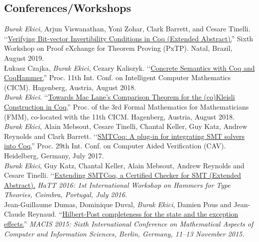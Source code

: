 \documentclass[12pt, a4paper]{article}
\newcommand{\years}[1]{\marginnote{\scriptsize #1}}
\begin{document}
\subsection*{Conferences/Workshops}
\years{\normalsize2019}
\emph{Burak Ekici}, Arjun Viswanathan, Yoni Zohar, Clark Barrett, and Cesare
Tinelli.
\lq\lq{\href{https://www.mimuw.edu.pl/~lukaszcz/cicm2018.pdf}{Verifying Bit-vector Invertibility Conditions in Coq (Extended Abstract).}}''
Sixth Workshop on Proof eXchange for Theorem Proving (PxTP). Natal, Brazil, August 2019.
\\[0.25cm]
\years{\normalsize2018}
\L ukasz Czajka, \emph{Burak Ekici}, Cezary Kaliszyk.
\lq\lq{\href{https://www.mimuw.edu.pl/~lukaszcz/cicm2018.pdf}{Concrete Semantics with Coq and CoqHammer.}}''
Proc. 11th Int. Conf. on Intelligent Computer Mathematics (CICM). Hagenberg, Austria, August 2018.
\\[0.25cm]
\years{\normalsize2018}
\emph{Burak Ekici}.
\lq\lq{\href{https://www.cicm-conference.org/2018/infproc/paper11.pdf}{Towards Mac Lane's Comparison Theorem for the (co)Kleisli Construction in Coq.}}''
Proc. of the 3rd Formal Mathematics for Mathematicians (FMM), co-located with the 11th CICM. Hagenberg, Austria, August 2018.
\\[0.25cm]
\years{\normalsize2017}
\emph{Burak Ekici}, Alain Mebsout, Cesare Tinelli,
Chantal Keller, Guy Katz, Andrew Reynolds and Clark Barrett. 
\lq\lq{\href{http://homepage.divms.uiowa.edu/~tinelli/papers/EkiEtAl-CAV-17.pdf}{SMTCoq: A plug-in for integrating SMT solvers into Coq.}}''
Proc. 29th Int. Conf. on Computer Aided Verification (CAV). Heidelberg, Germany, July 2017.
\\[0.25cm]
\years{\normalsize2016}
\emph{Burak Ekici}, Guy Katz, Chantal Keller, Alain Mebsout, Andrew Reynolds and Cesare Tinelli.
\lq\lq{\href{http://eptcs.web.cse.unsw.edu.au/paper.cgi?HaTT2016.5}{Extending SMTCoq, a Certified Checker for SMT (Extended Abstract).}}
\emph{HaTT 2016: 1st International Workshop on Hammers for Type Theories, Coimbra, Portugal, July 2016.}
\\[0.25cm]
\years{\normalsize2015}
Jean-Guillaume Dumas, Dominique Duval, \emph{Burak Ekici}, Damien Pous and Jean-Claude Reynaud. ``\href{https://hal.archives-ouvertes.fr/hal-01121924}{Hilbert-Post completeness for the state and the exception effects.}''
\emph{MACIS 2015: Sixth International Conference on Mathematical Aspects of Computer and Information Sciences, Berlin,
Germany, 11–13 November 2015.}
\\[0.25cm]
\end{document}
